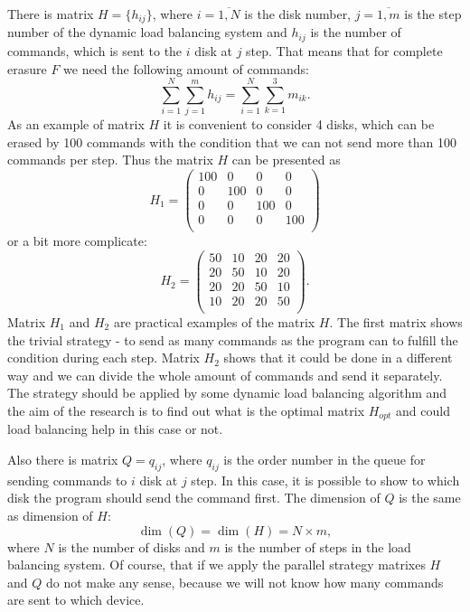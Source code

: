 There is matrix $H=\{h_{ij}\}$, where $i=\overline{1,N}$ is the disk number, $j=\overline{1,m}$ is the step number of the dynamic load balancing system and $h_{ij}$ is the number of commands, which is sent to the $i$ disk at $j$ step. That means that for complete erasure $F$ we need the following amount of commands:
\begin{equation}
\label{eq:load_balancing_matrix}
	\sum_{i=1}^{N}\sum_{j=1}^{m}h_{ij} = \sum_{i=1}^{N}\sum_{k=1}^{3}m_{ik}.
\end{equation}
As an example of matrix $H$ it is convenient to consider 4 disks, which can be erased by 100 commands with the condition that we can not send more than 100 commands per step. Thus the matrix $H$ can be presented as 
\begin{equation}
	H_1 =
	\begin{pmatrix}
		100 & 0 & 0 & 0 \\
		0 & 100 & 0 & 0 \\
		0 & 0 & 100 & 0 \\
		0 & 0 & 0 & 100 \\
	\end{pmatrix}
\end{equation}
or a bit more complicate:
\begin{equation}
	H_2 =
	\begin{pmatrix}
		50 & 10 & 20 & 20 \\
		20 & 50 & 10 & 20 \\
		20 & 20 & 50 & 10 \\
		10 & 20 & 20 & 50 \\
	\end{pmatrix}.
\end{equation}
Matrix $H_1$ and $H_2$ are practical examples of the matrix $H$. The first matrix shows the trivial strategy - to send as many commands as the program can to fulfill the condition during each step. Matrix $H_2$ shows that it could be done in a different way and we can divide the whole amount of commands and send it separately. The strategy should be applied by some dynamic load balancing algorithm and the aim of the research is to find out what is the optimal matrix $H_{opt}$ and could load balancing help in this case or not.

Also there is matrix $Q=q_{ij}$, where $q_{ij}$ is the order number in the queue for sending commands to $i$ disk at $j$ step. In this case, it is possible to show to which disk the program should send the command first. The dimension of $Q$ is the same as dimension of $H$: 
\begin{equation}
	\dim(Q) = \dim(H) = N \times m,
\end{equation}
where $N$ is the number of disks and $m$ is the number of steps in the load balancing system. Of course, that if we apply the parallel strategy matrixes $H$ and $Q$ do not make any sense, because we will not know how many commands are sent to which device. 

